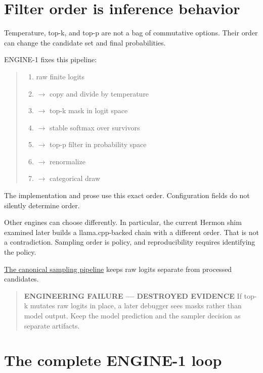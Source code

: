 \section{Filter order is inference
behavior}\label{filter-order-is-inference-behavior}

Temperature, top-k, and top-p are not a bag of commutative options.
Their order can change the candidate set and final probabilities.

ENGINE-1 fixes this pipeline:

\begin{quote}
\begin{enumerate}
\item raw finite logits
\item \(\longrightarrow\)  copy and divide by temperature
\item \(\longrightarrow\)  top-k mask in logit space
\item \(\longrightarrow\)  stable softmax over survivors
\item \(\longrightarrow\)  top-p filter in probability space
\item \(\longrightarrow\)  renormalize
\item \(\longrightarrow\)  categorical draw
\end{enumerate}
\end{quote}

The implementation and prose use this exact order. Configuration fields
do not silently determine order.

Other engines can choose differently. In particular, the current Hermon
shim examined later builds a llama.cpp-backed chain with a different
order. That is not a contradiction. Sampling order is policy, and
reproducibility requires identifying the policy.

\href{https://github.com/hermonai/inside-the-llm-engine/blob/astra-visual-rewrite/diagrams/sampling/sampling-pipeline.txt}{The
canonical sampling pipeline} keeps raw logits separate from processed
candidates.

\begin{quote}
\textbf{ENGINEERING FAILURE --- DESTROYED EVIDENCE} If top-k mutates raw
logits in place, a later debugger sees masks rather than model output.
Keep the model prediction and the sampler decision as separate
artifacts.
\end{quote}

\section{The complete ENGINE-1
loop}\label{the-complete-engine-1-loop}

